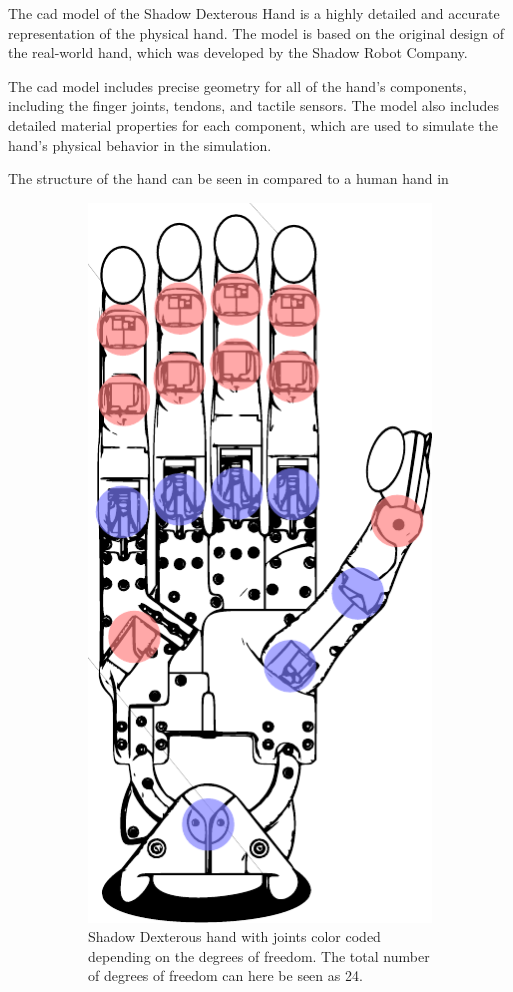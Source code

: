 The \gls{cad} model of the Shadow Dexterous Hand is a highly detailed and accurate representation of the physical hand. The model is based on the original design of the real-world hand, which was developed by the Shadow Robot Company. \medskip

The \gls{cad} model includes precise geometry for all of the hand's components, including the finger joints, tendons, and tactile sensors. The model also includes detailed material properties for each component, which are used to simulate the hand's physical behavior in the simulation.\medskip

The structure of the hand can be seen in  compared to a human hand in 

\begin{figure}[h]
	\centering
	\begin{subfigure}[b]{0.48\textwidth}
		\centering
		\includegraphics[height=\textwidth]{chapters/system-setup/fig/robot-hand-skeleton.pdf}
		\caption{Shadow Dexterous hand with joints color coded depending on the degrees of freedom. The total number of degrees of freedom can here be seen as \num{24}.}
		\label{fig:robot-hand-skeleton}
	\end{subfigure}
	\hfill
	\begin{subfigure}[b]{0.48\textwidth}

\end{subfigure}
\end{figure}
